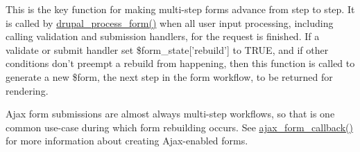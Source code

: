 This is the key function for making multi-\/step forms advance from step to step. It is called by \hyperlink{group__form__api_ga61186f5c43533761544a778918818fd2}{drupal\_\-process\_\-form()} when all user input processing, including calling validation and submission handlers, for the request is finished. If a validate or submit handler set \$form\_\-state\mbox{[}'rebuild'\mbox{]} to TRUE, and if other conditions don't preempt a rebuild from happening, then this function is called to generate a new \$form, the next step in the form workflow, to be returned for rendering.

Ajax form submissions are almost always multi-\/step workflows, so that is one common use-\/case during which form rebuilding occurs. See \hyperlink{group__ajax_gabe2739824006df057d291f6be49759ab}{ajax\_\-form\_\-callback()} for more information about creating Ajax-\/enabled forms.


